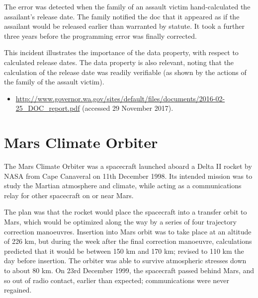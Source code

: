 The error was detected when the family of an assault victim hand-calculated the assailant's release date. The family notified the \gls{doc} that it appeared as if the assailant would be released earlier than warranted by statute. It took a further three years before the programming error was finally corrected.

This incident illustrates the importance of the  \gls{data property}, with respect to calculated release dates. The  \gls{data property} is also relevant, noting that the calculation of the release date was readily verifiable (as shown by the actions of the family of the assault victim).

\begin{samepage}
\begin{itemize}
	\item \raggedright{\href{http://www.governor.wa.gov/sites/default/files/documents/2016-02-25_DOC_report.pdf}{http://www.governor.wa.gov/sites/default/files/documents/2016-02-25\_DOC\_report.pdf} (accessed 29 November 2017).}
\end{itemize}
\end{samepage}


\section{Mars Climate Orbiter} \label{bkm:incacc:marsclimate}
The Mars Climate Orbiter was a spacecraft launched aboard a Delta II rocket by NASA from Cape Canaveral on 11th December 1998. Its intended mission was to study the Martian atmosphere and climate, while acting as a communications relay for other spacecraft on or near Mars.

The plan was that the rocket would place the spacecraft into a transfer orbit to Mars, which would be optimized along the way by a series of four trajectory correction manoeuvres. Insertion into Mars orbit was to take place at an altitude of 226 km, but during the week after the final correction manoeuvre, calculations predicted that it would be between 150 km and 170 km; revised to 110 km the day before insertion. The orbiter was able to survive atmospheric stresses down to about 80 km. On 23rd December 1999, the spacecraft passed behind Mars, and so out of radio contact, earlier than expected; communications were never regained.

